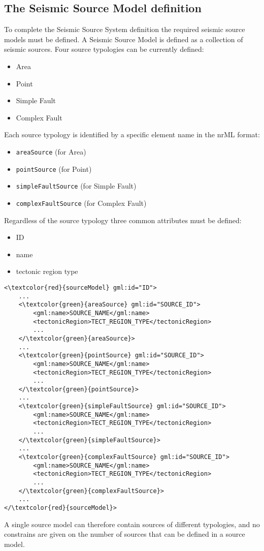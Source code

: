 \subsection{The Seismic Source Model definition}\label{seismicSourceNrml}
To complete the Seismic Source System definition the required seismic source models must be defined. A Seismic Source Model is defined as a collection of seismic sources. Four source typologies can be currently defined:
\begin{itemize}
\item Area
\item Point
\item Simple Fault
\item Complex Fault
\end{itemize}
Each source typology is identified by a specific element name in the nrML format:
\begin{itemize}
\item \Verb+areaSource+ (for Area)
\item \Verb+pointSource+ (for Point)
\item \Verb+simpleFaultSource+ (for Simple Fault)
\item \Verb+complexFaultSource+ (for Complex Fault)
\end{itemize}
Regardless of the source typology three common attributes must be defined:
\begin{itemize}
\item ID
\item name
\item tectonic region type 
\end{itemize}
\begin{Verbatim}[frame=single, commandchars=\\\{\},fontsize=\normalsize, samepage=true]
<\textcolor{red}{sourceModel} gml:id="ID">
	...
	<\textcolor{green}{areaSource} gml:id="SOURCE_ID">
		<gml:name>SOURCE_NAME</gml:name>
		<tectonicRegion>TECT_REGION_TYPE</tectonicRegion>
		...
	</\textcolor{green}{areaSource}>
	...
	<\textcolor{green}{pointSource} gml:id="SOURCE_ID">
		<gml:name>SOURCE_NAME</gml:name>
		<tectonicRegion>TECT_REGION_TYPE</tectonicRegion>
		...
	</\textcolor{green}{pointSource}>
	...
	<\textcolor{green}{simpleFaultSource} gml:id="SOURCE_ID">
		<gml:name>SOURCE_NAME</gml:name>
		<tectonicRegion>TECT_REGION_TYPE</tectonicRegion>
		...
	</\textcolor{green}{simpleFaultSource}>
	...
	<\textcolor{green}{complexFaultSource} gml:id="SOURCE_ID">
		<gml:name>SOURCE_NAME</gml:name>
		<tectonicRegion>TECT_REGION_TYPE</tectonicRegion>
		...
	</\textcolor{green}{complexFaultSource}>
	...
</\textcolor{red}{sourceModel}>
\end{Verbatim}
A single source model can therefore contain sources of different typologies, and no constrains are given on the number of sources that can be defined in a source model.

